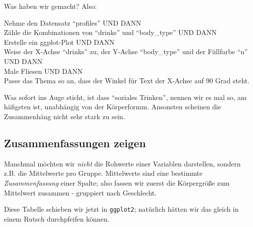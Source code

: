 \documentclass[12pt,]{book}
\makeatletter
\newenvironment{Shaded}{\begin{snugshade}}{\end{snugshade}}
\newcommand{\KeywordTok}[1]{\textcolor[rgb]{0.13,0.29,0.53}{\textbf{{#1}}}}
\newcommand{\DataTypeTok}[1]{\textcolor[rgb]{0.13,0.29,0.53}{{#1}}}
\newcommand{\StringTok}[1]{\textcolor[rgb]{0.31,0.60,0.02}{{#1}}}
\newcommand{\CommentTok}[1]{\textcolor[rgb]{0.56,0.35,0.01}{\textit{{#1}}}}
\newcommand{\NormalTok}[1]{{#1}}
\newenvironment{kframe}{%
\medskip{}
\setlength{\fboxsep}{.8em}
 \def\at@end@of@kframe{}%
 \ifinner\ifhmode%
  \def\at@end@of@kframe{\end{minipage}}%
  \begin{minipage}{\columnwidth}%
 \fi\fi%
 \def\FrameCommand##1{\hskip\@totalleftmargin \hskip-\fboxsep
 \colorbox{shadecolor}{##1}\hskip-\fboxsep
     \hskip-\linewidth \hskip-\@totalleftmargin \hskip\columnwidth}%
 \MakeFramed {\advance\hsize-\width
   \@totalleftmargin\z@ \linewidth\hsize
   \@setminipage}}%
 {\par\unskip\endMakeFramed%
 \at@end@of@kframe}
\renewenvironment{Shaded}{\begin{kframe}}{\end{kframe}}
\let\BeginKnitrBlock\begin \let\EndKnitrBlock\end
\makeatother
\begin{document}
Was haben wir gemacht? Also:

\BeginKnitrBlock{rmdpseudocode}
Nehme den Datensatz ``profiles'' UND DANN\\
Zähle die Kombinationen von ``drinks'' und ``body\_type'' UND DANN\\
Erstelle ein ggplot-Plot UND DANN\\
Weise der X-Achse ``drinks'' zu, der Y-Achse ``body\_type'' und der
Füllfarbe ``n'' UND DANN\\
Male Fliesen UND DANN\\
Passe das Thema so an, dass der Winkel für Text der X-Achse auf 90 Grad
steht.
\EndKnitrBlock{rmdpseudocode}

Was sofort ins Auge sticht, ist dass ``soziales Trinken'', nennen wir es
mal so, am häfigsten ist, unabhängig von der Körperformm. Ansonsten
scheinen die Zusammenhäng nicht sehr stark zu sein.

\subsection{Zusammenfassungen zeigen}\label{zusammenfassungen-zeigen}

Manchmal möchten wir \emph{nicht} die Rohwerte einer Variablen
darstellen, sondern z.B. die Mittelwerte pro Gruppe. Mittelwerte sind
eine bestimmte \emph{Zusammenfassung} einer Spalte; also fassen wir
zuerst die Körpergröße zum Mittelwert zusammen - gruppiert nach
Geschlecht.

\begin{Shaded}
\end{Shaded}

Diese Tabelle schieben wir jetzt in \texttt{ggplot2}; natürlich hätten
wir das gleich in einem Rutsch durchpfeifen können.

\begin{Shaded}
\end{Shaded}
\end{document}
